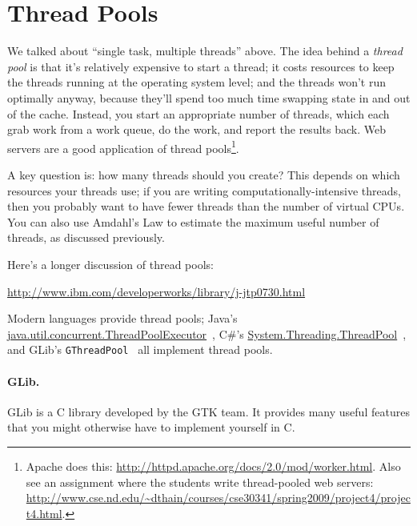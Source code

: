 \documentclass[a4paper]{report}
\begin{document}
\section*{Thread Pools} We talked about ``single task, multiple threads''
above. The idea behind a \emph{thread pool} is that it's relatively
expensive to start a thread; it costs resources to keep the threads
running at the operating system level; and the threads won't run
optimally anyway, because they'll spend too much time swapping state
in and out of the cache.  Instead, you start an appropriate number of
threads, which each grab work from a work queue, do the work,
and report the results back. Web servers are a good application of
thread pools\footnote{Apache does this: \url{http://httpd.apache.org/docs/2.0/mod/worker.html}. Also see an assignment where the students write thread-pooled web servers: \url{http://www.cse.nd.edu/~dthain/courses/cse30341/spring2009/project4/project4.html}.}.

A key question is: how many threads should you create?  This depends
on which resources your threads use; if you are writing
computationally-intensive threads, then you probably want to have
fewer threads than the number of virtual CPUs. You can also use
Amdahl's Law to estimate the maximum useful number of threads, as
discussed previously.

Here's a longer discussion of thread pools:

\begin{center}
\url{http://www.ibm.com/developerworks/library/j-jtp0730.html}
\end{center}

Modern languages provide thread pools; Java's
\url{java.util.concurrent.ThreadPoolExecutor}~\cite{java:threadpoolexecutor}, C\#'s
\url{System.Threading.ThreadPool}~\cite{csharp:threadpool}, and GLib's {\tt GThreadPool}~\cite{gnome:threadpool} all implement thread pools. 

\paragraph{GLib.} 
GLib is a C library developed by the GTK team. It provides many useful
features that you might otherwise have to implement yourself in C.
\end{document}
